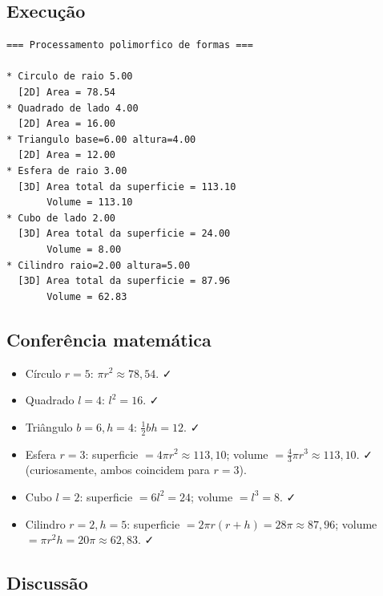 \documentclass[11pt,a4paper]{article}
\begin{document}


\subsection*{Execu\c{c}\~ao}

\begin{saidabox}
\begin{lstlisting}[style=terminal]
=== Processamento polimorfico de formas ===

* Circulo de raio 5.00
  [2D] Area = 78.54
* Quadrado de lado 4.00
  [2D] Area = 16.00
* Triangulo base=6.00 altura=4.00
  [2D] Area = 12.00
* Esfera de raio 3.00
  [3D] Area total da superficie = 113.10
       Volume = 113.10
* Cubo de lado 2.00
  [3D] Area total da superficie = 24.00
       Volume = 8.00
* Cilindro raio=2.00 altura=5.00
  [3D] Area total da superficie = 87.96
       Volume = 62.83
\end{lstlisting}
\end{saidabox}

\subsection*{Confer\^encia matem\'atica}

\begin{itemize}[leftmargin=*,itemsep=0pt]
  \item C\'irculo $r=5$: $\pi r^2 \approx 78{,}54$. ✓
  \item Quadrado $l=4$: $l^2 = 16$. ✓
  \item Tri\^angulo $b=6, h=4$: $\tfrac{1}{2}bh = 12$. ✓
  \item Esfera $r=3$: superficie $= 4\pi r^2 \approx 113{,}10$; volume $= \tfrac{4}{3}\pi r^3 \approx 113{,}10$. ✓ (curiosamente, ambos coincidem para $r=3$).
  \item Cubo $l=2$: superficie $= 6l^2 = 24$; volume $= l^3 = 8$. ✓
  \item Cilindro $r=2, h=5$: superficie $= 2\pi r(r+h) = 28\pi \approx 87{,}96$; volume $= \pi r^2 h = 20\pi \approx 62{,}83$. ✓
\end{itemize}

\subsection*{Discuss\~ao}
\end{document}
